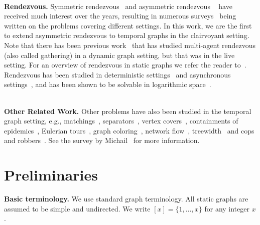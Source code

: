 \documentclass[10pt,a4paper]{article}
\begin{document}
~\\ \noindent \textbf{Rendezvous.} 
%
Symmetric rendezvous~\cite{Alpern76} and asymmetric rendezvous ~\cite{Alpern95}
have received much interest over the years, resulting in numerous
surveys~\cite{Alpern02,AlpernG06,Flocchini19,KranakisKM22,KranakisKR06,Pelc12,Pelc19}
being written on the problems covering different settings. 
In this work, we are
the first to extend asymmetric rendezvous to temporal graphs in the clairvoyant
setting. Note that there has been previous
work~\cite{BournatDP18,DasDPP19,DiLunaFPPSV20,MichailST21,OoshitaD18,ShibataKESNK23,ShibataSNK21}
that has studied multi-agent rendezvous (also called gathering) in a dynamic
graph setting, but that was in the live setting. 
%
For an overview of rendezvous in static graphs we refer the reader to~\cite{AlpernG06,
KranakisKR06}. Rendezvous has been studied in deterministic
settings~\cite{BhagatP22,Pelc23} and asynchronous
settings~\cite{dieudonne2013meet,MARCO2006315}, and has been shown to be
solvable in logarithmic space~\cite{CzyzowiczJKAP10}.

~\\ \noindent \textbf{Other Related Work.}  
Other problems have also been studied in the temporal graph setting, e.g.,
matchings~\cite{MertziosMNZZ20},
separators~\cite{FLUSCHNIK2020197,ZSCHOCHE202072}, vertex
covers~\cite{AKRIDA2020108,HammKMS22}, containments of
epidemics~\cite{ENRIGHT202160}, Eulerian tours~\cite{BumpusM23,MarinoS21}, graph
coloring~\cite{MarinoS22,MertziosMZ21}, network flow~\cite{AKRIDA201946},
treewidth~\cite{Fluschnik2020} and cops and robbers~\cite{Erlebach-Spooner/20,MorawietzRW20}. See
the survey by Michail~\cite{Michail16} for more information.


\section{Preliminaries}
\label{sec:pre}

\textbf{Basic terminology.} We use standard graph terminology. All static graphs
are assumed to be simple and undirected. We write $[x]=\{1, \ldots, x\}$ for any
integer $x$.
\end{document}
